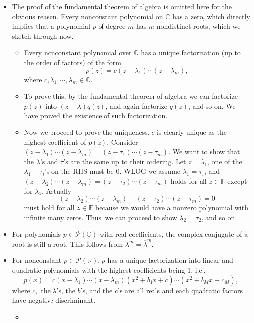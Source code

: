 \documentclass{article}
\newcommand{\R}{\mathbb{R}}
\newcommand{\C}{\mathbb{C}}
\newcommand{\F}{\mathbb{F}}
\newcommand{\conj}[1]{\overline{#1}}
\begin{document}
\begin{itemize}
    \item The proof of the fundamental theorem of algebra is omitted here for the obvious reason. Every nonconstant polynomial on $\C$ has a zero, which directly implies that a polynomial $p$ of degree $m$ has $m$ nondistinct roots, which we sketch through now.
    \begin{itemize}
        \item Every nonconstant polynomial over $\C$ has a unique factorization (up to the order of factors) of the form $$p(z) = c(z - \lambda_1)\cdots(z-\lambda_m),$$ where $c, \lambda_1,\cdots,\lambda_m \in \C$.
    \end{itemize}
    \begin{itemize}
        \item To prove this, by the fundamental theorem of algebra we can factorize $p(z)$ into $(z-\lambda)q(z)$, and again factorize $q(z)$, and so on. We have proved the existence of such factorization.
        \item Now we proceed to prove the uniqueness. $c$ is clearly unique as the highest coefficient of $p(z)$. Consider $(z - \lambda_1)\cdots(z-\lambda_m)=(z - \tau_1)\cdots(z-\tau_m)$. We want to show that the $\lambda$'s and $\tau$'s are the same up to their ordering. Let $z = \lambda_1$, one of the $\lambda_1 - \tau_i$'s on the RHS must be 0. WLOG we assume $\lambda_1 = \tau_1$, and $(z - \lambda_2)\cdots(z-\lambda_m)=(z - \tau_2)\cdots(z-\tau_m)$ holds for all $z \in \F$ except for $\lambda_1$. Actually $$(z - \lambda_2)\cdots(z-\lambda_m) - (z - \tau_2)\cdots(z-\tau_m) = 0$$ must hold for all $z \in \F$ because we would have a nonzero polynomial with infinite many zeros. Thus, we can proceed to show $\lambda_2 = \tau_2$, and so on.
    \end{itemize}
    \item For polynomials $p \in \mathcal{P}(\C)$ with real coefficients, the complex conjugate of a root is still a root. This follows from $\lambda^m = \conj{\lambda}^m$.
    
    \item For nonconstant $p \in \mathcal{P}(\R)$, $p$ has a unique factorization into linear and quadratic polynomials with the highest coefficients being 1, i.e., $$p(x)=c(x-\lambda_1)\cdots(x-\lambda_m)(x^2+b_1x+c)\cdots(x^2+b_Mx+c_M),$$ where $c,$ the $\lambda$'s, the $b$'s, and the $c$'s are all reals and each quadratic factors have negative discriminant.
    \begin{itemize}
        \item 
    \end{itemize}
\end{itemize}
\end{document}

